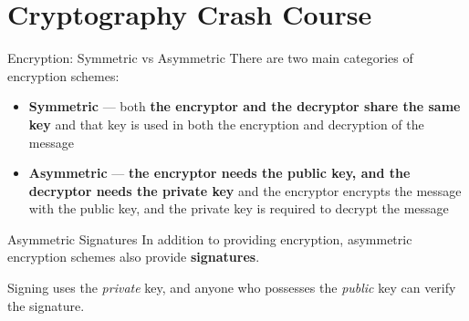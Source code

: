 \documentclass{beeper}
\begin{document}
\section{Cryptography Crash Course}

\begin{frame}{Encryption: Symmetric vs Asymmetric}
    There are two main categories of encryption schemes:

    \begin{itemize}
        \item \textbf{Symmetric} --- both \textbf{the encryptor and the
            decryptor share the same key} and that key is used in both the
            encryption and decryption of the message
            \pause
        \item \textbf{Asymmetric} --- \textbf{the encryptor needs the public
            key, and the decryptor needs the private key} and the encryptor
            encrypts the message with the public key, and the private key is
            required to decrypt the message
    \end{itemize}

\end{frame}

\begin{frame}{Asymmetric Signatures}
    In addition to providing encryption, asymmetric encryption schemes also
    provide \textbf{signatures}.
    \pause

    Signing uses the \textit{private} key, and anyone who possesses the
    \textit{public} key can verify the signature.


\end{frame}
\end{document}
